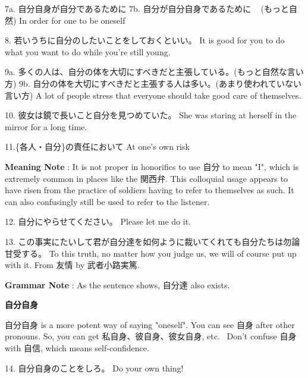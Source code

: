 \par{7a. 自分自身が自分であるために \hfill\break
7b. 自分が自分自身であるために   (もっと自然) \hfill\break
In order for one to be oneself }

\par{8. 若いうちに自分のしたいことをしておくといい。 \hfill\break
It is good for you to do what you want to do while you're still young. }

\par{9a. 多くの人は、自分の体を大切にすべきだと主張している。(もっと自然な言い方) \hfill\break
9b. 自分の体を大切にすべきだと主張する人は多い。(あまり使われていない言い方) \hfill\break
A lot of people stress that everyone should take good care of themselves. }

\par{10. 彼女は鏡で長いこと自分を見つめていた。 \hfill\break
She was staring at herself in the mirror for a long time. }

\par{11.\{各人・自分\}の責任において \hfill\break
At one's own risk }

\par{\textbf{Meaning Note }: It is not proper in honorifics to use 自分 to mean "I", which is extremely common in places like the 関西弁. This colloquial usage appears to have risen from the practice of soldiers having to refer to themselves as such. It can also confusingly still be used to refer to the listener. }

\par{12. 自分にやらせてください。 \hfill\break
Please let me do it. }

\par{13. この事実にたいして君が自分達を如何ように裁いてくれても自分たちは勿論甘受する。 \hfill\break
To this truth, no matter how you judge us, we will of course put up with it. \hfill\break
From 友情 by 武者小路実篤. }

\par{\textbf{Grammar Note }: As the sentence shows, 自分達 also exists. }

\begin{center}
 \textbf{自分自身 }
\end{center}

\par{ 自分自身 is a more potent way of saying "oneself". You can see 自身 after other pronouns. So, you can get 私自身、彼自身、彼女自身, etc.  Don't confuse 自身 with 自信, which means self-confidence. }

\par{14. 自分自身のことをしろ。 \hfill\break
Do your own thing! }

